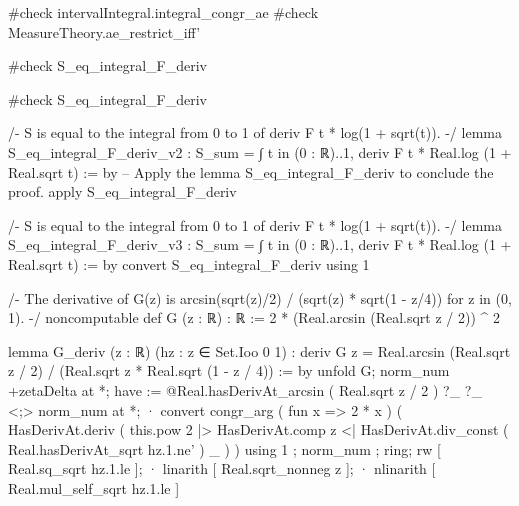 #check intervalIntegral.integral_congr_ae
#check MeasureTheory.ae_restrict_iff'

#check S_eq_integral_F_deriv

#check S_eq_integral_F_deriv

/-
S is equal to the integral from 0 to 1 of deriv F t * log(1 + sqrt(t)).
-/
lemma S_eq_integral_F_deriv_v2 : S_sum = ∫ t in (0 : ℝ)..1, deriv F t * Real.log (1 + Real.sqrt t) := by
  -- Apply the lemma S_eq_integral_F_deriv to conclude the proof.
  apply S_eq_integral_F_deriv

/-
S is equal to the integral from 0 to 1 of deriv F t * log(1 + sqrt(t)).
-/
lemma S_eq_integral_F_deriv_v3 : S_sum = ∫ t in (0 : ℝ)..1, deriv F t * Real.log (1 + Real.sqrt t) := by
  convert S_eq_integral_F_deriv using 1

/-
The derivative of G(z) is arcsin(sqrt(z)/2) / (sqrt(z) * sqrt(1 - z/4)) for z in (0, 1).
-/
noncomputable def G (z : ℝ) : ℝ := 2 * (Real.arcsin (Real.sqrt z / 2)) ^ 2

lemma G_deriv (z : ℝ) (hz : z ∈ Set.Ioo 0 1) :
  deriv G z = Real.arcsin (Real.sqrt z / 2) / (Real.sqrt z * Real.sqrt (1 - z / 4)) := by
    unfold G;
    norm_num +zetaDelta at *;
    have := @Real.hasDerivAt_arcsin ( Real.sqrt z / 2 ) ?_ ?_ <;> norm_num at *;
    · convert congr_arg ( fun x => 2 * x ) ( HasDerivAt.deriv ( this.pow 2 |> HasDerivAt.comp z <| HasDerivAt.div_const ( Real.hasDerivAt_sqrt hz.1.ne' ) _ ) ) using 1 ; norm_num ; ring;
      rw [ Real.sq_sqrt hz.1.le ];
    · linarith [ Real.sqrt_nonneg z ];
    · nlinarith [ Real.mul_self_sqrt hz.1.le ]

